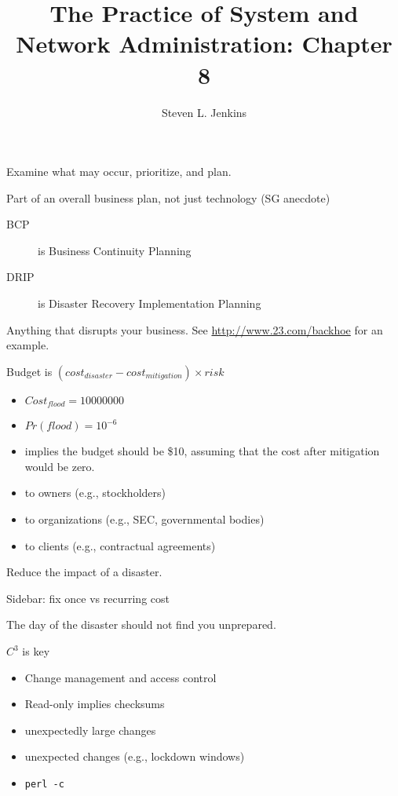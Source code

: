 \documentclass{slides}
\title{The Practice of System and Network Administration: Chapter 8}
\author{Steven L. Jenkins}
\newcommand{\bi}{\begin{itemize}}
\newcommand{\ei}{\end{itemize}}
\newcommand{\bd}{\begin{description}}
\newcommand{\ed}{\end{description}}
\begin{document}



Examine what may occur, prioritize, and plan.

Part of an overall business plan, not just technology (SG anecdote)

\bd
\item[BCP] is Business Continuity Planning
\item[DRIP] is Disaster Recovery Implementation Planning
\ed


Anything that disrupts your business.  See \url{http://www.23.com/backhoe}
for an example.


Budget is $(cost_{disaster} - cost_{mitigation})\times risk$

\bi
\item $Cost_{flood} = 10000000$
\item $Pr(flood) = 10^{-6}$
\item implies the budget should be \$10, assuming that the cost after
mitigation would be zero.
\ei


\bi
\item to owners (e.g., stockholders)
\item to organizations (e.g., SEC, governmental bodies)
\item to clients (e.g., contractual agreements)
\ei


Reduce the impact of a disaster.

Sidebar: fix once vs recurring cost


The day of the disaster should not find you unprepared.

$C^3$ is key


\bi
\item Change management and access control
\item Read-only implies checksums
\item unexpectedly large changes
\item unexpected changes (e.g., lockdown windows)
\item {\tt perl -c}
\ei
\end{document}
